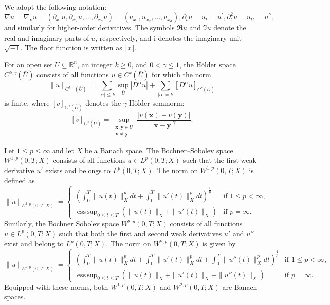 \documentclass[11pt,reqno,oneside]{amsart}
\numberwithin{equation}{section}
\theoremstyle{definition}
\theoremstyle{remark}
\numberwithin{equation}{section}
\begin{document}
    \iffalse 
We adopt the following notation:
\[
\nabla u = \nabla_{\mathbf{x}} u
= \left( \partial_{x_1} u, \partial_{x_2} u, \dots, \partial_{x_d} u \right)
= \left( u_{x_1}, u_{x_2}, \dots, u_{x_d} \right), 
\partial_t u = u_t = u^\prime,\partial_t^2 u = u_{tt} = u^{\prime\prime},
\]
and similarly for higher-order derivatives. The symbols $\Re u$ and $\Im u$ denote the real and imaginary parts of $u$, respectively, and $\mathrm{i}$ denotes the imaginary unit $\sqrt{-1}$. The floor function is written as $\lfloor x \rfloor$.

	For an open set $U \subseteq \mathbb{R}^n$, an integer $k \geq 0$, and $0 < \gamma \leq 1$, the H\" older space $C^{k,\gamma}(\bar{U})$ consists of all functions $u \in C^k(\bar{U})$ for which the norm
	$$
	\|u\|_{C^{k,\gamma}(\bar{U})} = \sum_{|\alpha| \leq k} \sup_{\bar{U}} |D^{\alpha}u| + \sum_{|\alpha| = k} [D^{\alpha}u]_{C^{\gamma}(\bar{U})}
	$$
	is finite, where $[v]_{C^{\gamma}(\bar{U})}$ denotes the $\gamma$-H\" older seminorm:
	$$
	[v]_{C^{\gamma}(\bar{U})} = \sup_{\substack{\mathbf{x},\mathbf{y} \in U \\ \mathbf{x} \neq \mathbf{y}}} \frac{|v(\mathbf{x})-v(\mathbf{y})|}{|\mathbf{x}-\mathbf{y}|^{\gamma}}.
	$$
	
	Let $1 \leq p \leq \infty$ and let $X$ be a Banach space. The Bochner–Sobolev space $W^{1,p}(0,T;X)$ consists of all functions $u \in L^p(0,T;X)$ such that the first weak derivative $u'$ exists and belongs to $L^p(0,T;X)$. The norm on $W^{1,p}(0,T;X)$ is defined as
	\[
	\|u\|_{W^{1,p}(0,T;X)} = 
	\begin{cases}
		\left(\int_0^T \|u(t)\|_X^p  dt + \int_0^T \|u'(t)\|_X^p  dt\right)^{\frac{1}{p}} & \text{if } 1 \leq p < \infty, \\
		\operatorname{ess\,sup}_{0 \leq t \leq T} \left(\|u(t)\|_X + \|u'(t)\|_X\right) & \text{if } p = \infty.
	\end{cases}
	\]
	Similarly, the Bochner Sobolev space $W^{2,p}(0,T;X)$ consists of all functions $u \in L^p(0,T;X)$ such that both the first and second weak derivatives $u'$ and $u''$ exist and belong to $L^p(0,T;X)$. The norm on $W^{2,p}(0,T;X)$ is given by
	\[
	\|u\|_{W^{2,p}(0,T;X)} = 
	\begin{cases}
		\left(\int_0^T \|u(t)\|_X^p  dt + \int_0^T \|u'(t)\|_X^p  dt + \int_0^T \|u''(t)\|_X^p  dt\right)^{\frac{1}{p}} & \text{if } 1 \leq p < \infty, \\
		\operatorname{ess\,sup}_{0 \leq t \leq T} \left(\|u(t)\|_X + \|u'(t)\|_X + \|u''(t)\|_X\right) & \text{if } p = \infty.
	\end{cases}
	\]
	Equipped with these norms, both $W^{1,p}(0,T;X)$ and $W^{2,p}(0,T;X)$ are Banach spaces.
\end{document}
